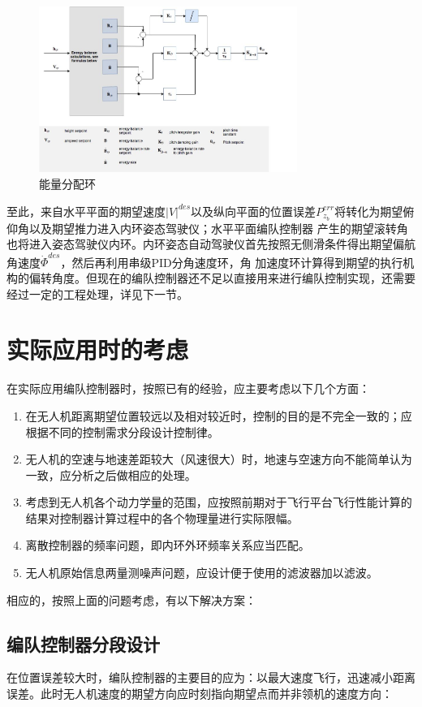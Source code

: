 \begin{figure}[H]
    \centering
    \includegraphics[width=0.75\textwidth]{figures/c3/TECS_pitch.jpg}
    \caption{能量分配环}\label{fig:balance_energy}
\end{figure}
至此，来自水平平面的期望速度$|V|^{des}$以及纵向平面的位置误差$P_{z_b}^{err}$将转化为期望俯仰角以及期望推力进入内环姿态驾驶仪；水平平面编队控制器
产生的期望滚转角也将进入姿态驾驶仪内环。内环姿态自动驾驶仪首先按照无侧滑条件得出期望偏航角速度$\dot{\Phi}^{des}$，然后再利用串级PID分角速度环，角
加速度环计算得到期望的执行机构的偏转角度。但现在的编队控制器还不足以直接用来进行编队控制实现，还需要经过一定的工程处理，详见下一节。
\section{实际应用时的考虑}
在实际应用编队控制器时，按照已有的经验，应主要考虑以下几个方面：
\begin{enumerate}
    \item 在无人机距离期望位置较远以及相对较近时，控制的目的是不完全一致的；应根据不同的控制需求分段设计控制律。
    \item 无人机的空速与地速差距较大（风速很大）时，地速与空速方向不能简单认为一致，应分析之后做相应的处理。
    \item 考虑到无人机各个动力学量的范围，应按照前期对于飞行平台飞行性能计算的结果对控制器计算过程中的各个物理量进行实际限幅。
    \item 离散控制器的频率问题，即内环外环频率关系应当匹配。
    \item 无人机原始信息两量测噪声问题，应设计便于使用的滤波器加以滤波。
\end{enumerate}
相应的，按照上面的问题考虑，有以下解决方案：

\subsection{编队控制器分段设计} 
在位置误差较大时，编队控制器的主要目的应为：以最大速度飞行，迅速减小距离误差。此时无人机速度的期望方向应时刻指向期望点而并非领机的速度方向：
